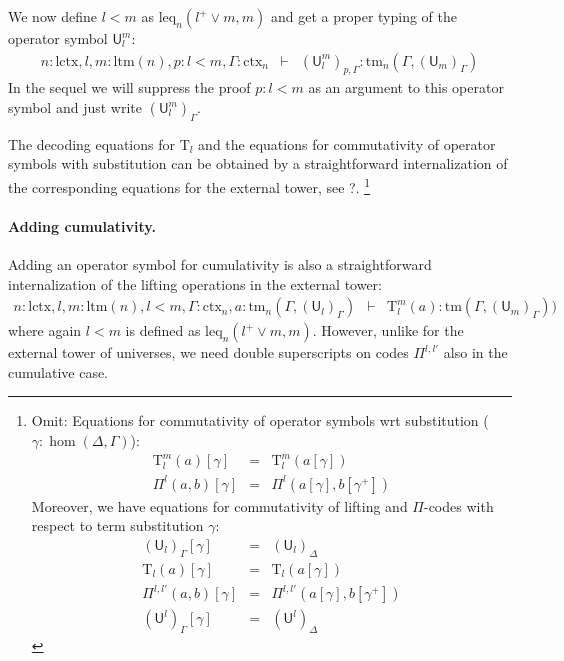 \documentclass[11pt,a4paper]{article}
\theoremstyle{definition}
\newcommand{\UU}{\mathsf{U}}
\def\UU{\mathsf{U}}
\newcommand{\N}{\mathsf{N}}
\def\lctx{\mathrm{lctx}}
\def\ltm{\mathrm{ltm}}
\def\leq{\mathrm{leq}}
\newcommand{\ctx}{\mathrm{ctx}}
\newcommand{\tm}{\mathrm{tm}}
\def\U{\mathsf{U}}
\newcommand{\Ta}{\mathrm{T}}
\begin{document}
We now define $l < m$ as $\leq_n(l^+ \vee m, m)$ and get a proper typing of the operator symbol $\UU^m_l$:
\begin{eqnarray*}
n : \lctx, l, m : \ltm(n), p : l < m, \Gamma : \ctx_n&\vdash&(\UU^m_l)_{p,\Gamma} : \tm_n(\Gamma,(\UU_{m})_\Gamma)
\end{eqnarray*}
In the sequel we will suppress the proof $p : l < m$ as an argument to this operator symbol and just write $(\UU^m_l)_{\Gamma}$.

The decoding equations for $\Ta_l$ and the equations for commutativity of operator symbols with substitution can be obtained by a straightforward internalization of the corresponding equations for the external tower, see ?.
\footnote{Omit:
Equations for commutativity of operator symbols wrt substitution ($\gamma : \hom(\Delta,\Gamma)$):
\begin{eqnarray*}
\Ta^m_l(a) [ \gamma ] &=& \Ta^m_l(a[ \gamma ] )\\
\Pi^{l}(a,b)[ \gamma ] &=& \Pi^{l}(a [ \gamma ], b[ \gamma^+ ])
\end{eqnarray*}
Moreover, we have equations for commutativity of lifting and $\Pi$-codes with respect to term substitution $\gamma$:
 \begin{eqnarray*}
(\U_l)_\Gamma [ \gamma ] &=& (\U_l)_\Delta\\
\Ta_l(a) [ \gamma ] &=& \Ta_l(a[ \gamma ] )\\
\Pi^{l,l'}(a,b)[ \gamma ] &=& \Pi^{l,l'}(a [ \gamma ], b[ \gamma^+ ])\\
(\UU^l)_\Gamma[ \gamma ] &=&(\UU^l)_\Delta
\end{eqnarray*}
}

\paragraph{Adding cumulativity.} Adding an operator symbol for cumulativity is also a straightforward internalization of the lifting operations in the external tower:
\begin{eqnarray*}
n : \lctx, l,m : \ltm(n), l < m, \Gamma : \ctx_n, a : \tm_n(\Gamma,(\U_{l})_\Gamma) &\vdash& {\Ta^m_{l}}(a) : \tm(\Gamma,(\U_{m})_\Gamma))
\end{eqnarray*}
where again $l < m$ is defined as $\leq_n(l^+ \vee m, m)$. However, unlike for the external tower of universes, we need double superscripts on codes $\Pi^{l,l'}$ also in the cumulative case. 
\end{document}
